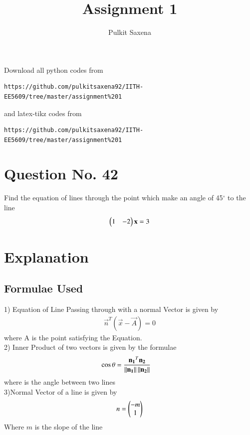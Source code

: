 \documentclass[journal,12pt,twocolumn]{IEEEtran}
\begin{document}
     \def\rightbox#1{\makebox[0in][r]{#1}}
     \def\centbox#1{\makebox[0in]{#1}}
     \def\topbox#1{\raisebox{-\baselineskip}[0in][0in]{#1}}
     \def\midbox#1{\raisebox{-0.5\baselineskip}[0in][0in]{#1}}
\vspace{3cm}
\title{Assignment 1}
\author{Pulkit Saxena}
\maketitle
\newpage
\bigskip
\renewcommand{\thefigure}{\theenumi}
\renewcommand{\thetable}{\theenumi}
%
Download all python codes from 
\begin{lstlisting}
https://github.com/pulkitsaxena92/IITH-EE5609/tree/master/assignment%201
\end{lstlisting}
%
and latex-tikz codes from 
%
\begin{lstlisting}
https://github.com/pulkitsaxena92/IITH-EE5609/tree/master/assignment%201
\end{lstlisting}
\section{Question No. 42}
Find the equation of lines through the point   which make an angle of 45$^{\circ}$ to the line
\begin{align}
\begin{pmatrix}1 & -2\end{pmatrix}\mathbf{x} = 3 
\end{align}
\section{Explanation}
\subsection{Formulae Used}
1) Equation of Line Passing through  with a normal Vector is given by
\begin{align}
\vec{n}^T(\vec{x}-\vec{A})=0 
\end{align}
where A is the point satisfying the Equation.
\\2) Inner Product of two vectors is given by the formulae
\begin{align}
 \cos \theta &= \frac{\mathbf{n_1}^T\mathbf{n_2}}{\left\lVert\mathbf{n_1}\right\rVert\left\lVert\mathbf{n_2}\right\rVert}  
\end{align}
where is the angle between two lines
\\3)Normal Vector of a line is given by
\begin{align}
n=\begin{pmatrix}-m\\1\end{pmatrix}
\end{align}
Where $m$ is the slope of the line
\end{document}
